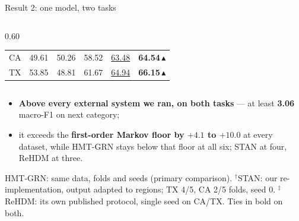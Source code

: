 \documentclass{beamer}
\begin{document}
\begin{frame}{Result 2: one model, two tasks}
{\begin{columns}[T,onlytextwidth]
\begin{column}{0.60\textwidth}
\begin{tabular}{@{}lrrrrr@{}}
            CA  & 49.61 & 50.26\rlap{$^\ddagger$} & 58.52\rlap{$^\dagger$} & \underline{63.48} & \textbf{64.54}\,\textcolor{primaryshade}{$\blacktriangle$} \\
            TX  & 53.85 & 48.81\rlap{$^\ddagger$} & 61.67\rlap{$^\dagger$} & \underline{64.94} & \textbf{66.15}\,\textcolor{primaryshade}{$\blacktriangle$} \\
            \bottomrule
        \end{tabular}
    \end{column}
    \end{columns}\par}

    \vspace{1mm}
    {\footnotesize
    \begin{itemize}\setlength{\itemsep}{0pt}
        \item \textbf{Above every external system we ran, on both tasks} --- at least
              \textbf{3.06} macro-F1 on next category;
        \item it exceeds the \textbf{first-order Markov floor by $+4.1$ to $+10.0$} at every dataset,
              while \alert{HMT-GRN stays below that floor at all six}; STAN at four, ReHDM at three.
    \end{itemize}\par}

    {\scriptsize HMT-GRN: same data, folds and seeds (primary comparison).
    $^\dagger$STAN: our re-implementation, output adapted to regions; TX 4/5, CA 2/5 folds, seed 0.
    $^\ddagger$ReHDM: its own published protocol, single seed on CA/TX. Ties in bold on both.\par}
\end{frame}
\end{document}
